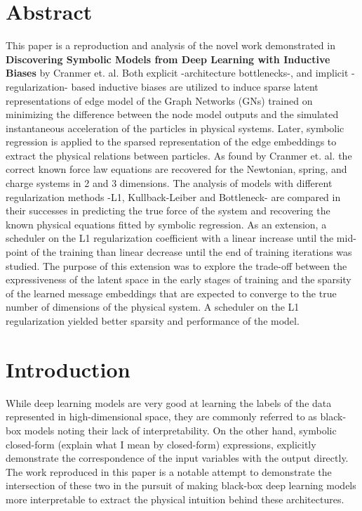 \documentclass{article}
\begin{document}
\section{Abstract}
This paper is a reproduction and analysis of the novel work demonstrated in \textbf{Discovering Symbolic Models from Deep Learning with Inductive Biases} by Cranmer et. al. Both explicit -architecture bottlenecks-, and implicit -regularization- based inductive biases are utilized to induce sparse latent representations of edge model of the Graph Networks (GNs) trained on minimizing the difference between the node model outputs and the simulated instantaneous acceleration of the particles in physical systems. Later, symbolic regression is applied to the sparsed representation of the edge embeddings to extract the physical relations between particles. As found by Cranmer et. al. the correct known force law equations are recovered for the Newtonian, spring, and charge systems in 2 and 3 dimensions. The analysis of models with different regularization methods -L1, Kullback-Leiber and Bottleneck- are compared in their successes in predicting the true force of the system and recovering the known physical equations fitted by symbolic regression. As an extension, a scheduler on the L1 regularization coefficient with a linear increase until the mid-point of the training than linear decrease until the end of training iterations was studied. The purpose of this extension was to explore the trade-off between the expressiveness of the latent space in the early stages of training and the sparsity of the learned message embeddings that are expected to converge to the true number of dimensions of the physical system. A scheduler on the L1 regularization yielded better sparsity and performance of the model.



\section{Introduction}

While deep learning models are very good at learning the labels of the data represented in high-dimensional space, they are commonly referred to as black-box models noting their lack of interpretability. On the other hand, symbolic closed-form (explain what I mean by closed-form) expressions, explicitly demonstrate the correspondence of the input variables with the output directly. The work reproduced in this paper is a notable attempt to demonstrate the intersection of these two in the pursuit of making black-box deep learning models more interpretable to extract the physical intuition behind these architectures.
\end{document}
